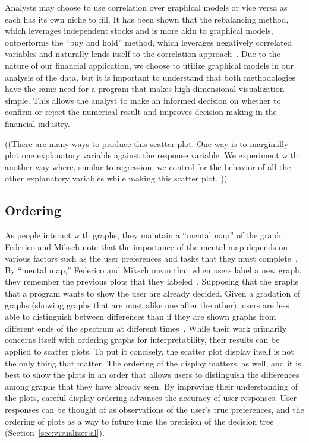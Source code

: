 Analysts may choose to use correlation over graphical models or vice versa as
each has its own niche to fill. It has been shown that the rebalancing method,
which leverages independent stocks and is more akin to graphical models,
outperforms the ``buy and hold'' method, which leverages negatively correlated
variables and naturally lends itself to the correlation
approach~\cite{liuh2016}. Due to the nature of our financial application, we
choose to utilize graphical models in our analysis of the data, but it is
important to understand that both methodologies have the same need for a program
that makes high dimensional visualization simple. This allows the analyst to
make an informed decision on whether to confirm or reject the numerical result
and improves decision-making in the financial industry.

((There are many ways to produce this scatter plot. One way is to marginally
plot one explanatory variable against the response variable. We experiment with
another way where, similar to regression, we control for the behavior of all the
other explanatory variables while making this scatter plot. ))

\subsection{Ordering}

As people interact with graphs, they maintain a ``mental map'' of the graph.
Federico and Miksch note that the importance of the mental map depends on
various factors such as the user preferences and tasks that they must
complete~\cite{federico2016}. By ``mental map,'' Federico and Miksch mean that
when users label a new graph, they remember the previous plots that they
labeled~\cite{federico2016}. Supposing that the graphs that a program wants to
show the user are already decided. Given a gradation of graphs (showing graphs
that are most alike one after the other), users are less able to distinguish
between differences than if they are shown graphs from different ends of the
spectrum at different times~\cite{federico2016}. While their work primarily
concerns itself with ordering graphs for interpretability, their results can be
applied to scatter plots. To put it concisely, the scatter plot display itself
is not the only thing that matter. The ordering of the display matters, as well,
and it is best to show the plots in an order that allows users to distinguish
the differences among graphs that they have already seen. By improving their
understanding of the plots, careful display ordering advances the accuracy of
user responses. User responses can be thought of as observations of the user’s
true preferences, and the ordering of plots as a way to future tune the
precision of the decision tree (Section~\ref{sec:visualizer:al}). 

